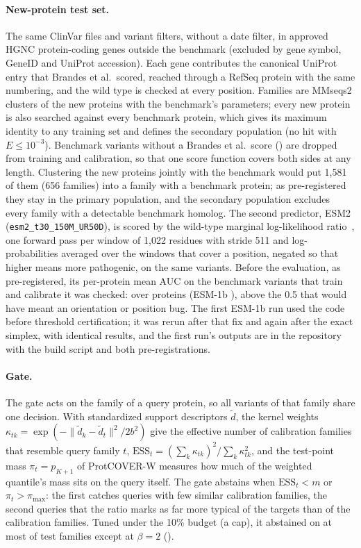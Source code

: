 \paragraph{New-protein test set.} The same ClinVar files and variant filters, without a date filter, in approved HGNC protein-coding genes outside the benchmark (excluded by gene symbol, GeneID and UniProt accession). Each gene contributes the canonical UniProt entry that Brandes et al.\ scored, reached through a RefSeq protein with the same numbering, and the wild type is checked at every position. Families are MMseqs2 clusters of the new proteins with the benchmark's parameters; every new protein is also searched against every benchmark protein, which gives its maximum identity to any training set and defines the secondary population (no hit with $E\le10^{-3}$). Benchmark variants without a Brandes et al.\ score (\unsNBenchDropped{}) are dropped from training and calibration, so that one score function covers both sides at any length. Clustering the new proteins jointly with the benchmark would put 1,581 of them (656 families) into a family with a benchmark protein; as pre-registered they stay in the primary population, and the secondary population excludes every family with a detectable benchmark homolog. The second predictor, ESM2 (\texttt{esm2\_t30\_150M\_UR50D}), is scored by the wild-type marginal log-likelihood ratio~\cite{meier2021language}, one forward pass per window of 1,022 residues with stride 511 and log-probabilities averaged over the windows that cover a position, negated so that higher means more pathogenic, on the same variants. Before the evaluation, as pre-registered, its per-protein mean AUC on the benchmark variants that train and calibrate it was checked: \unsTwoValidAuc{} over \unsTwoValidNProt{} proteins (ESM-1b \unsTwoValidAucEsmOne{}), above the 0.5 that would have meant an orientation or position bug. The first ESM-1b run used the code before threshold certification; it was rerun after that fix and again after the exact simplex, with identical results, and the first run's outputs are in the repository with the build script and both pre-registrations.

\paragraph{Gate.} The gate acts on the family of a query protein, so all variants of that family share one decision. With standardized support descriptors $\tilde d$, the kernel weights $\kappa_{tk}=\exp(-\|\tilde d_k-\tilde d_t\|^2/2b^2)$ give the effective number of calibration families that resemble query family $t$, $\mathrm{ESS}_t=(\sum_k\kappa_{tk})^2/\sum_k\kappa_{tk}^2$, and the test-point mass $\pi_t=p_{K+1}$ of ProtCOVER-W measures how much of the weighted quantile's mass sits on the query itself. The gate abstains when $\mathrm{ESS}_t<m$ or $\pi_t>\pi_{\max}$: the first catches queries with few similar calibration families, the second queries that the ratio marks as far more typical of the targets than of the calibration families. Tuned under the 10\% budget (a cap), it abstained on at most \gateAbsMaxNoBtwo{} of test families except at $\beta=2$ (\gateAbsBtwo{}).

